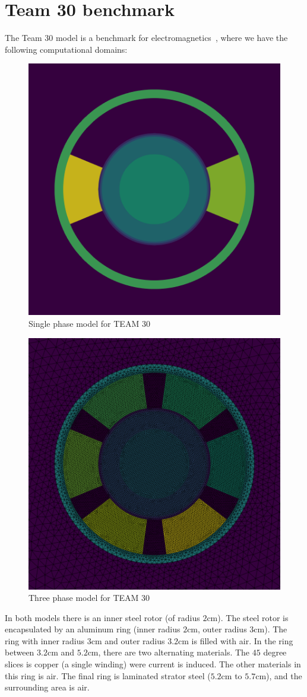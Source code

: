 \documentclass{article}
\begin{document}
\section{Team 30 benchmark}

The Team 30 model is a benchmark for
electromagnetics~\cite{daveyteam30}, where we have the following
computational domains:
\begin{figure}[!ht]
    \centering
    \includegraphics[width=0.6\linewidth]{team_30_single_phase.png}
    \caption{Single phase model for TEAM 30}
    \label{fig:single_phase}
\end{figure}
\begin{figure}[!ht]
    \centering
    \includegraphics[width=0.6\linewidth]{team_30_three_phase.png}
    \caption{Three phase model for TEAM 30}
    \label{fig:three_phase}
\end{figure}
In both models there is an inner steel rotor (of radius $2$cm). The
steel rotor is encapsulated by an aluminum ring (inner radius $2$cm,
outer radius $3$cm). The ring with inner radius $3$cm and outer radius
$3.2$cm is filled with air. In the ring between $3.2$cm and $5.2$cm,
there are two alternating materials. The $45$ degree slices is copper (a
single winding) were current is induced. The other materials in this
ring is air. The final ring is laminated strator steel ($5.2$cm to
$5.7$cm), and the surrounding area is air.
\end{document}
